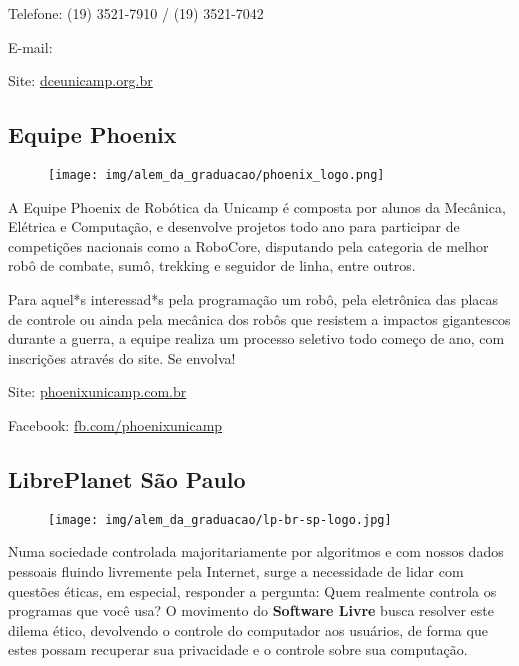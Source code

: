 \begin{compactitemize}
    \item  Telefone: (19) 3521-7910 / (19) 3521-7042
    \item  E-mail: 
    \item  Site: \url{dceunicamp.org.br}
\end{compactitemize}

\subsection{Equipe Phoenix}

\begin{figure}[h!]
    \centering
    \texttt{[image: img/alem\_da\_graduacao/phoenix\_logo.png]}
\end{figure}

A Equipe Phoenix de Robótica da Unicamp é composta por alunos da Mecânica,
Elétrica e Computação, e desenvolve projetos todo ano para participar de
competições nacionais como a RoboCore, disputando pela categoria de melhor robô
de combate, sumô, trekking e seguidor de linha, entre outros.

Para aquel*s interessad*s pela programação um robô, pela eletrônica das placas
de controle ou ainda pela mecânica dos robôs que resistem a impactos gigantescos
durante a guerra, a equipe realiza um processo seletivo todo começo de ano, com
inscrições através do site. Se envolva!

\begin{compactitemize}
    \item  Site: \url{phoenixunicamp.com.br}
    \item  Facebook: \url{fb.com/phoenixunicamp}
\end{compactitemize}

\subsection{LibrePlanet São Paulo}

\begin{figure}[h!]
    \centering
    \texttt{[image: img/alem\_da\_graduacao/lp-br-sp-logo.jpg]}
\end{figure}

Numa sociedade controlada majoritariamente por algoritmos e com nossos dados
pessoais fluindo livremente pela Internet, surge a necessidade de lidar com
questões éticas, em especial, responder a pergunta: Quem realmente controla os
programas que você usa?  O movimento do {\bf Software Livre} busca resolver este
dilema ético, devolvendo o controle do computador aos usuários, de forma que
estes possam recuperar sua privacidade e o controle sobre sua computação.

